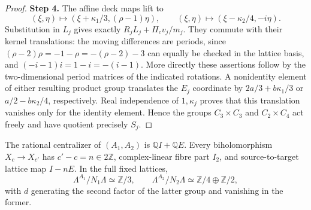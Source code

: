 \begin{proof}
\par\smallskip\noindent\textbf{Step 4.} The affine deck maps lift to
\[
 (\xi,\eta)\longmapsto(\xi+\kappa_1/3,(\rho-1)\eta),\qquad
 (\xi,\eta)\longmapsto(\xi-\kappa_2/4,-i\eta).
\]
Substitution in $L_j$ gives exactly $R_jL_j+\Pi_cv_j/m_j$. They commute with their kernel translations: the moving differences are periods, since $(\rho-2)\rho=-1-\rho=-(\rho-2)-3$ can equally be checked in the lattice basis, and $(-i-1)i=1-i=-(i-1)$. More directly these assertions follow by the two-dimensional period matrices of the indicated rotations. A nonidentity element of either resulting product group translates the $E_j$ coordinate by $2a/3+b\kappa_1/3$ or $a/2-b\kappa_2/4$, respectively. Real independence of $1,\kappa_j$ proves that this translation vanishes only for the identity element. Hence the groups $C_3\times C_3$ and $C_2\times C_4$ act freely and have quotient precisely $S_j$.
\end{proof}
\begin{cited}[FAM A.2.1; K]\label{fam:A.2.1}
The rational centralizer of $(A_1,A_2)$ is $\mathbb QI+\mathbb QE$. Every biholomorphism $X_c\to X_{c'}$ has $c'-c=n\in2\mathbb Z$, complex-linear fibre part $I_2$, and source-to-target lattice map $I-nE$. In the full fixed lattices,
\[
 \Lambda^{A_1}/N_1\Lambda\simeq\mathbb Z/3,\qquad
 \Lambda^{A_2}/N_2\Lambda\simeq\mathbb Z/4\oplus\mathbb Z/2,
\]
with $d$ generating the second factor of the latter group and vanishing in the former.
\end{cited}
